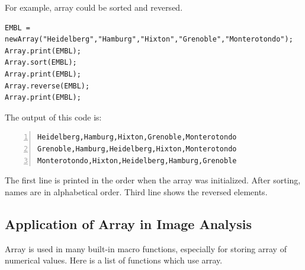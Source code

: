 For example, array could be sorted and reversed.
\begin{lstlisting}[numbers=none]
EMBL = newArray("Heidelberg","Hamburg","Hixton","Grenoble","Monterotondo");
Array.print(EMBL);
Array.sort(EMBL);
Array.print(EMBL);
Array.reverse(EMBL);
Array.print(EMBL);
\end{lstlisting} 
The output of this code is:
\begin{lstlisting}[numbers=left]
Heidelberg,Hamburg,Hixton,Grenoble,Monterotondo
Grenoble,Hamburg,Heidelberg,Hixton,Monterotondo
Monterotondo,Hixton,Heidelberg,Hamburg,Grenoble
\end{lstlisting} 
The first line is printed in the order when the array was initialized. After
sorting, names are in alphabetical order. Third line shows the reversed
elements. 

\subsection{Application of Array in Image Analysis}

Array is used in many built-in macro functions, especially for storing array of numerical values. Here is a list of functions which use array. 


